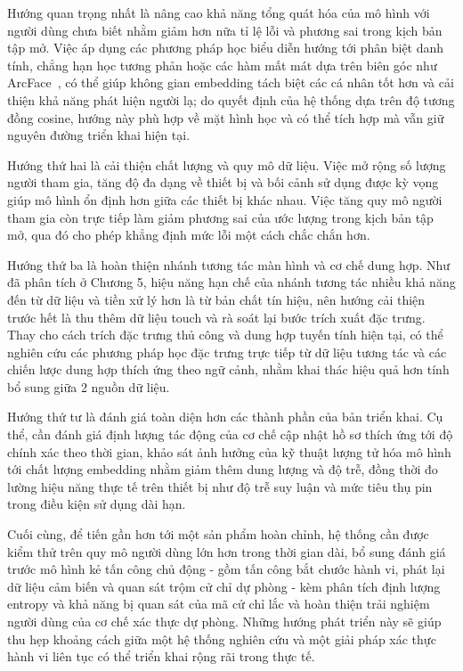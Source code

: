\documentclass[../DoAn.tex]{subfiles}
\begin{document}
Hướng quan trọng nhất là nâng cao khả năng tổng quát hóa của mô hình với người dùng chưa biết nhằm giảm hơn nữa tỉ lệ lỗi và phương sai trong kịch bản tập mở. Việc áp dụng các phương pháp học biểu diễn hướng tới phân biệt danh tính, chẳng hạn học tương phản hoặc các hàm mất mát dựa trên biên góc như ArcFace~\cite{deng2019arcface}, có thể giúp không gian embedding tách biệt các cá nhân tốt hơn và cải thiện khả năng phát hiện người lạ; do quyết định của hệ thống dựa trên độ tương đồng cosine, hướng này phù hợp về mặt hình học và có thể tích hợp mà vẫn giữ nguyên đường triển khai hiện tại.

Hướng thứ hai là cải thiện chất lượng và quy mô dữ liệu. Việc mở rộng số lượng người tham gia, tăng độ đa dạng về thiết bị và bối cảnh sử dụng được kỳ vọng giúp mô hình ổn định hơn giữa các thiết bị khác nhau. Việc tăng quy mô người tham gia còn trực tiếp làm giảm phương sai của ước lượng trong kịch bản tập mở, qua đó cho phép khẳng định mức lỗi một cách chắc chắn hơn.

Hướng thứ ba là hoàn thiện nhánh tương tác màn hình và cơ chế dung hợp. Như đã phân tích ở Chương 5, hiệu năng hạn chế của nhánh tương tác nhiều khả năng đến từ dữ liệu và tiền xử lý hơn là từ bản chất tín hiệu, nên hướng cải thiện trước hết là thu thêm dữ liệu touch và rà soát lại bước trích xuất đặc trưng. Thay cho cách trích đặc trưng thủ công và dung hợp tuyến tính hiện tại, có thể nghiên cứu các phương pháp học đặc trưng trực tiếp từ dữ liệu tương tác và các chiến lược dung hợp thích ứng theo ngữ cảnh, nhằm khai thác hiệu quả hơn tính bổ sung giữa 2 nguồn dữ liệu.

Hướng thứ tư là đánh giá toàn diện hơn các thành phần của bản triển khai. Cụ thể, cần đánh giá định lượng tác động của cơ chế cập nhật hồ sơ thích ứng tới độ chính xác theo thời gian, khảo sát ảnh hưởng của kỹ thuật lượng tử hóa mô hình tới chất lượng embedding nhằm giảm thêm dung lượng và độ trễ, đồng thời đo lường hiệu năng thực tế trên thiết bị như độ trễ suy luận và mức tiêu thụ pin trong điều kiện sử dụng dài hạn.

Cuối cùng, để tiến gần hơn tới một sản phẩm hoàn chỉnh, hệ thống cần được kiểm thử trên quy mô người dùng lớn hơn trong thời gian dài, bổ sung đánh giá trước mô hình kẻ tấn công chủ động - gồm tấn công bắt chước hành vi, phát lại dữ liệu cảm biến và quan sát trộm cử chỉ dự phòng - kèm phân tích định lượng entropy và khả năng bị quan sát của mã cử chỉ lắc và hoàn thiện trải nghiệm người dùng của cơ chế xác thực dự phòng. Những hướng phát triển này sẽ giúp thu hẹp khoảng cách giữa một hệ thống nghiên cứu và một giải pháp xác thực hành vi liên tục có thể triển khai rộng rãi trong thực tế.
\end{document}
